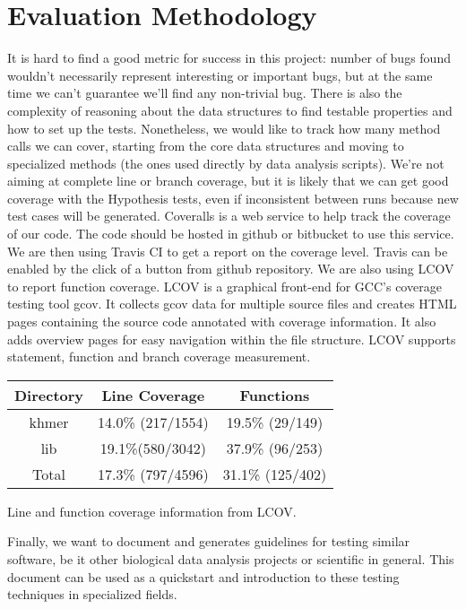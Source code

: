\documentclass[preprint,nocopyrightspace]{sig-alternate}
\begin{document}
\section{Evaluation Methodology}
It is hard to find a good metric for success in this project:
number of bugs found wouldn't necessarily represent interesting or important bugs,
but at the same time we can't guarantee we'll find any non-trivial bug.
There is also the complexity of reasoning about the data structures to find testable properties and how to set up the tests.
Nonetheless,
we would like to track how many method calls we can cover,
starting from the core data structures and moving to specialized methods (the ones used directly by data analysis scripts).
We're not aiming at complete line or branch coverage,
but it is likely that we can get good coverage with the Hypothesis tests,
even if inconsistent between runs because new test cases will be generated.
Coveralls is a web service to help track the coverage of our code.
The code should be hosted in github or bitbucket to use this service.
We are then using Travis CI to get a report on the coverage level.
Travis can be enabled by the click of a button from github repository.
We are also using LCOV to report function coverage. 
LCOV is a graphical front-end for GCC's coverage testing tool gcov. 
It collects gcov data for multiple source files and creates HTML pages containing the 
source code annotated with coverage information. 
It also adds overview pages for easy navigation within the file structure. 
LCOV supports statement, function and branch coverage measurement.

\noindent
\begin{minipage}{\textwidth}
  \captionsetup{type=table}
  \centering
  \begin{tabular}{|c|c|c|}
  \toprule
  Directory & Line Coverage & Functions \\ 
  \midrule
  khmer		& 14.0\% (217/1554)	& 19.5\% (29/149) \\ 
  lib		& 19.1\%(580/3042)	& 37.9\% (96/253) \\ 
  Total		& 17.3\% (797/4596)	& 31.1\% (125/402) \\
  \bottomrule
  \end{tabular}
  \medskip

  \caption{Line and function coverage information from LCOV.}\label{table:clove}
\end{minipage}

Finally,
we want to document and generates guidelines for testing similar software,
be it other biological data analysis projects or scientific in general.
This document can be used as a quickstart and introduction to these testing techniques in specialized fields.
\end{document}
